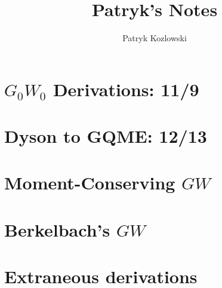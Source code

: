 \documentclass[12pt]{report}
\title{Patryk's Notes}
\author{Patryk Kozlowski}
\begin{document}
\setcounter{tocdepth}{3}  %
\tableofcontents
\clearpage  %

\maketitle

\chapter{$G_0W_0$ Derivations: 11/9}

\chapter{Dyson to GQME: 12/13}

\chapter{Moment-Conserving $GW$}

\chapter{Berkelbach's $GW$}




\chapter{Extraneous derivations}

\end{document}

